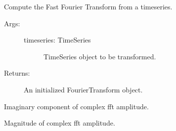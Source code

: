 \documentclass[letterpaper,10pt,english]{sphinxmanual}
\begin{document}
\begin{fulllineitems}
\begin{fulllineitems}
\begin{description}
\begin{description}
\end{description}

\end{description}

\end{fulllineitems}


\begin{fulllineitems}
\label{\detokenize{index:sigpropy.FourierTransform.from_timeseries}}
Compute the Fast Fourier Transform from a timeseries.
\begin{description}
\item[{Args:}] \leavevmode\begin{description}
\item[{timeseries: TimeSeries }] \leavevmode
TimeSeries object to be transformed.

\end{description}

\item[{Returns:}] \leavevmode
An initialized FourierTransform object.

\end{description}

\end{fulllineitems}


\begin{fulllineitems}
\label{\detokenize{index:sigpropy.FourierTransform.imag}}
Imaginary component of complex fft amplitude.

\end{fulllineitems}


\begin{fulllineitems}
\label{\detokenize{index:sigpropy.FourierTransform.mag}}
Magnitude of complex fft amplitude.

\end{fulllineitems}


\end{fulllineitems}
\end{document}
